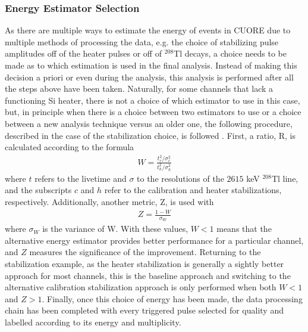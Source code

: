 \subsubsection*{Energy Estimator Selection}
As there are multiple ways to estimate the energy of events in CUORE due to multiple methods of processing the data, e.g. the choice of stabilizing pulse amplitudes off of the heater pulses or off of $^{208}$Tl decays, a choice needs to be made as to which estimation is used in the final analysis.
Instead of making this decision a priori or even during the analysis, this analysis is performed after all the steps above have been taken.
Naturally, for some channels that lack a functioning Si heater, there is not a choice of which estimator to use in this case, but, in principle when there is a choice between two estimators to use or a choice between a new analysis technique versus an older one, the following procedure, described in the case of the stabilization choice, is followed \cite{PRL2017_InternalNote}.
First, a ratio, R, is calculated according to the formula
\begin{align}
    W=\frac{t_c^2/\sigma_c^2}{t_h^2/\sigma_h^2}
\end{align}
where $t$ refers to the livetime and $\sigma$ to the resolutions of the $2615$ keV $^{208}$Tl line, and the subscripts $c$ and $h$ refer to the calibration and heater stabilizations, respectively.
Additionally, another metric, Z, is used with
\begin{align}
    Z = \frac{1-W}{\sigma_W}
\end{align}
where $\sigma_W$ is the variance of W.
With these values, $W<1$ means that the alternative energy estimator provides better performance for a particular channel, and $Z$ measures the significance of the improvement.
Returning to the stabilization example, as the heater stabilization is generally a sightly better approach for most channels, this is the baseline approach and switching to the alternative calibration stabilization approach is only performed when both $W<1$ and $Z>1$.
Finally, once this choice of energy has been made, the data processing chain has been completed with every triggered pulse selected for quality and labelled according to its energy and multiplicity.